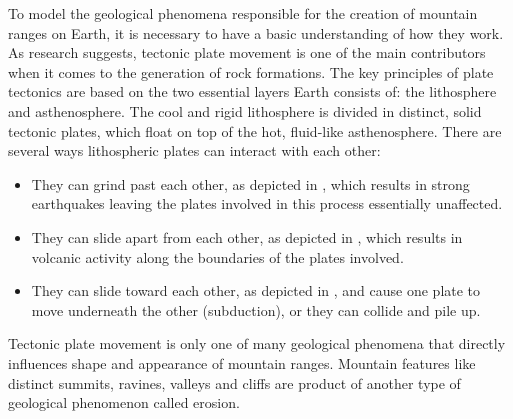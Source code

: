 \documentclass[11pt,a4paper,twoside,openright]{report}
\begin{document}
To model the geological phenomena responsible for the creation of mountain ranges on Earth, it is necessary to have a basic understanding of how they work. As research \cite{wiki:platetectonics} suggests, tectonic plate movement is one of the main contributors when it comes to the generation of rock formations. The key principles of plate tectonics are based on the two essential layers Earth consists of: the lithosphere and asthenosphere. The cool and rigid lithosphere is divided in distinct, solid tectonic plates, which float on top of the hot, fluid-like asthenosphere. There are several ways lithospheric plates can interact with each other:
\begin{itemize}
  \item They can grind past each other, as depicted in , which results in strong earthquakes leaving the plates involved in this process essentially unaffected.
  \item They can slide apart from each other, as depicted in , which results in volcanic activity along the boundaries of the plates involved.
  \item They can slide toward each other, as depicted in , and cause one plate to move underneath the other (subduction), or they can collide and pile up.
\end{itemize}
Tectonic plate movement is only one of many geological phenomena that directly influences shape and appearance of mountain ranges. Mountain features like distinct summits, ravines, valleys and cliffs are product of another type of geological phenomenon called erosion.
\end{document}
